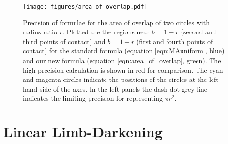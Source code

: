 \documentclass[modern]{aastex61}
\begin{document}
\begin{figure}
    \begin{centering}
    \texttt{[image: figures/area\_of\_overlap.pdf]}
    \caption{Precision of formulae for the area of overlap of two circles with
    radius ratio $r$.  Plotted are the regions near $b=1-r$ (second and third
    points of contact) and $b=1+r$ (first and fourth points of contact) for
    the standard formula (equation \ref{eqn:MAuniform}, blue) and our new formula 
    (equation \ref{eqn:area_of_overlap}, green). 
    The high-precision calculation is shown in red for comparison. The
    cyan and magenta circles indicate the positions of the circles at the left
    hand side of the axes.  In the left panels the dash-dot grey line indicates the 
    limiting precision for representing $\pi r^2$.}\label{fig:overlap_precision}
    \end{centering}
\end{figure}

\section{Linear Limb-Darkening}
\label{sec:reparam}
\end{document}
